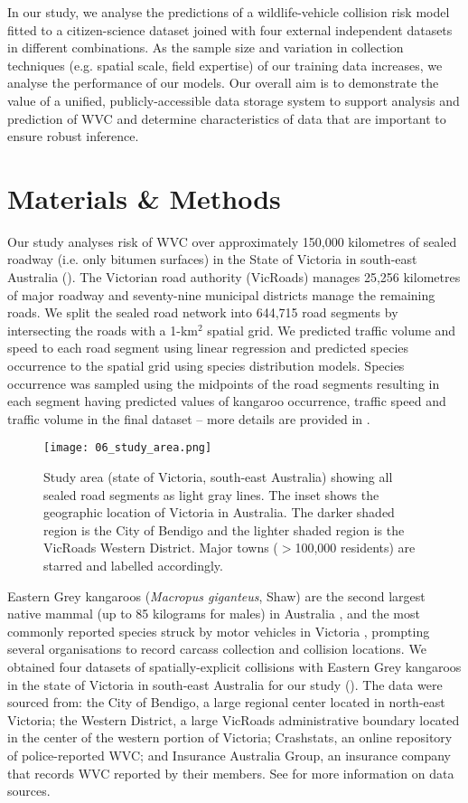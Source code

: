In our study, we analyse the predictions of a wildlife-vehicle collision risk model fitted to a citizen-science dataset joined with four external independent datasets in different combinations. As the sample size and variation in collection techniques (e.g. spatial scale, field expertise) of our training data increases, we analyse the performance of our models. Our overall aim is to demonstrate the value of a unified, publicly-accessible data storage system to support analysis and prediction of WVC and determine characteristics of data that are important to ensure robust inference.

\section{Materials \& Methods}

Our study analyses risk of WVC over approximately 150,000 kilometres of sealed roadway (i.e. only bitumen surfaces) in the State of Victoria in south-east Australia (). The Victorian road authority (VicRoads) manages 25,256 kilometres of major roadway and seventy-nine municipal districts manage the remaining roads. We split the sealed road network into 644,715 road segments by intersecting the roads with a 1-km$^2$ spatial grid. We predicted traffic volume and speed to each road segment using linear regression and predicted species occurrence to the spatial grid using species distribution models. Species occurrence was sampled using the midpoints of the road segments resulting in each segment having predicted values of kangaroo occurrence, traffic speed and traffic volume in the final dataset -- more details are provided in . 

\begin{figure*}[!t]
  \centering
  \texttt{[image: 06\_study\_area.png]}
  \caption[Study area for model validation]{Study area (state of Victoria, south-east Australia) showing all sealed road segments as light gray lines. The inset shows the geographic location of Victoria in Australia. The darker shaded region is the City of Bendigo and the lighter shaded region is the VicRoads Western District. Major towns ($>$100,000 residents) are starred and labelled accordingly.}
  \label{val_study_area}
\end{figure*}

Eastern Grey kangaroos (\textit{Macropus giganteus}, Shaw) are the second largest native mammal (up to 85 kilograms for males) in Australia \citep{coul10}, and the most commonly reported species struck by motor vehicles in Victoria \citep{rowd08}, prompting several organisations to record carcass collection and collision locations. We obtained four datasets of spatially-explicit collisions with Eastern Grey kangaroos in the state of Victoria in south-east Australia for our study (). The data were sourced from: the City of Bendigo, a large regional center located in north-east Victoria; the Western District, a large VicRoads administrative boundary located in the center of the western portion of Victoria; Crashstats, an online repository of police-reported WVC; and Insurance Australia Group, an insurance company that records WVC reported by their members. See  for more information on data sources.


